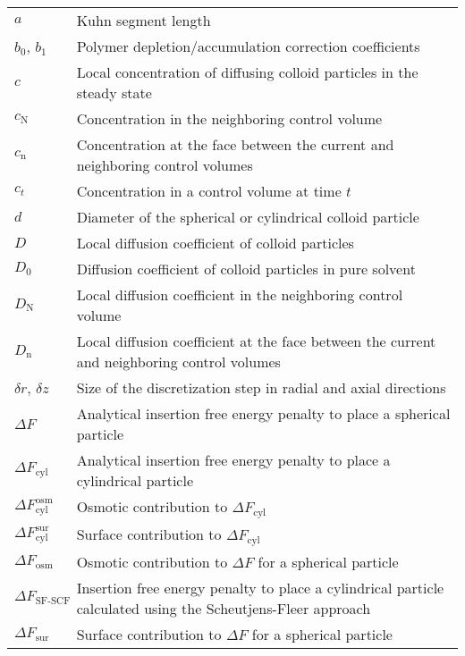 \documentclass[10pt, a4paper]{article}
\begin{document}
\begin{tabularx}{\linewidth}{l X}
    $a$ & Kuhn segment length \\
    $b_0$, $b_1$ & Polymer depletion/accumulation correction coefficients \\
    $c$ & Local concentration of diffusing colloid particles in the steady state \\
    $c_{\text{N}}$ & Concentration in the neighboring control volume \\
    $c_{\text{n}}$ & Concentration at the face between the current and neighboring control volumes \\
    $c_{t}$ & Concentration in a control volume at time $t$ \\
    $d$ & Diameter of the spherical or cylindrical colloid particle \\
    $D$ & Local diffusion coefficient of colloid particles \\
    $D_0$ & Diffusion coefficient of colloid particles in pure solvent \\
    $D_{\text{N}}$ & Local diffusion coefficient in the neighboring control volume \\
    $D_{\text{n}}$ & Local diffusion coefficient at the face between the current and neighboring control volumes \\
    $\delta r$, $\delta z$ & Size of the discretization step in radial and axial directions \\
    $\Delta F$ & Analytical insertion free energy penalty to place a spherical particle \\
    $\Delta F_{\text{cyl}}$ & Analytical insertion free energy penalty to place a cylindrical particle \\
    $\Delta F_{\text{cyl}}^{\text{osm}}$ & Osmotic contribution to $\Delta F_{\text{cyl}}$ \\
    $\Delta F_{\text{cyl}}^{\text{sur}}$ & Surface contribution to $\Delta F_{\text{cyl}}$ \\
    $\Delta F_{\text{osm}}$ & Osmotic contribution to $\Delta F$ for a spherical particle\\
    $\Delta F_{\text{SF-SCF}}$ & Insertion free energy penalty to place a cylindrical particle calculated using the Scheutjens-Fleer approach \\
    $\Delta F_{\text{sur}}$ & Surface contribution to $\Delta F$ for a spherical particle\\

\end{tabularx}
\end{document}

